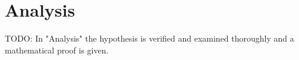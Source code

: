 \documentclass[Bachelorarbeit.tex]{subfiles}
\begin{document}
\chapter{Analysis}
TODO: 
In "Analysis" the hypothesis is verified and examined thoroughly and a mathematical proof is given.
\end{document}
